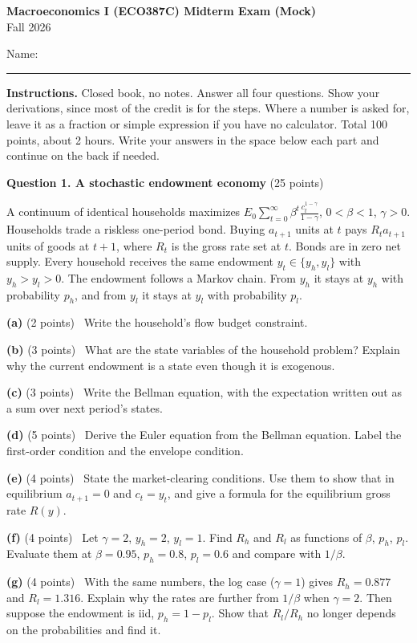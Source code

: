 \documentclass[12pt]{article}
\newcommand{\E}{E}
\newcommand{\gap}[1]{\par\vspace{#1}}
\newcommand{\qp}[2]{\par\medskip\textbf{(#1)} (#2 points)\ }
\begin{document}
\begin{center}
{\large\bfseries Macroeconomics I (ECO387C) Midterm Exam (Mock)}\\[1mm]
Fall 2026
\end{center}

Name: \rule{3in}{0.4pt}

\textbf{Instructions.} Closed book, no notes. Answer all four questions.
Show your derivations, since most of the credit is for the steps. Where a
number is asked for, leave it as a fraction or simple expression if you have
no calculator. Total 100 points, about 2 hours. Write your answers in the space below each part and continue on the back if needed.

\textbf{Question 1. A stochastic endowment economy} (25 points)

A continuum of identical households maximizes
$\E_0\sum_{t=0}^\infty\beta^t\frac{c_t^{1-\gamma}}{1-\gamma}$, $0<\beta<1$,
$\gamma>0$. Households trade a riskless one-period bond. Buying $a_{t+1}$
units at $t$ pays $R_ta_{t+1}$ units of goods at $t+1$, where $R_t$ is the
gross rate set at $t$. Bonds are in zero net supply. Every household
receives the same endowment $y_t\in\{y_h,y_l\}$ with $y_h>y_l>0$. The
endowment follows a Markov chain. From $y_h$ it stays at $y_h$ with
probability $p_h$, and from $y_l$ it stays at $y_l$ with probability $p_l$.

\needspace{6.0cm}
\qp{a}{2} Write the household's flow budget constraint.
\gap{3.5cm}
\needspace{7.0cm}
\qp{b}{3} What are the state variables of the household problem? Explain
why the current endowment is a state even though it is exogenous.
\gap{4.5cm}
\needspace{7.0cm}
\qp{c}{3} Write the Bellman equation, with the expectation written out as
a sum over next period's states.
\gap{4.5cm}
\needspace{10.0cm}
\qp{d}{5} Derive the Euler equation from the Bellman equation. Label the
first-order condition and the envelope condition.
\gap{7.5cm}
\needspace{8.5cm}
\qp{e}{4} State the market-clearing conditions. Use them to show that in
equilibrium $a_{t+1}=0$ and $c_t=y_t$, and give a formula for the
equilibrium gross rate $R(y)$.
\gap{6.0cm}
\needspace{8.5cm}
\qp{f}{4} Let $\gamma=2$, $y_h=2$, $y_l=1$. Find $R_h$ and $R_l$ as
functions of $\beta$, $p_h$, $p_l$. Evaluate them at $\beta=0.95$,
$p_h=0.8$, $p_l=0.6$ and compare with $1/\beta$.
\gap{6.0cm}
\needspace{8.5cm}
\qp{g}{4} With the same numbers, the log case ($\gamma=1$) gives
$R_h=0.877$ and $R_l=1.316$. Explain why the rates are further from
$1/\beta$ when $\gamma=2$. Then suppose the endowment is iid, $p_h=1-p_l$.
Show that $R_l/R_h$ no longer depends on the probabilities and find it.
\end{document}
